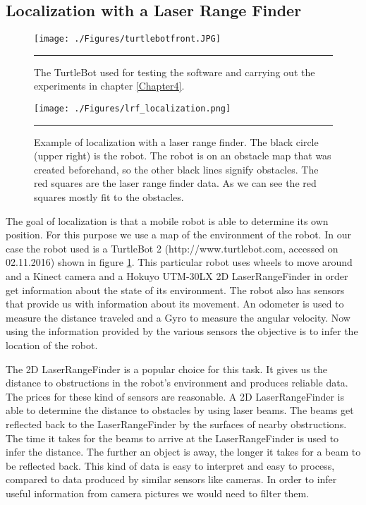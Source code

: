 \subsection{Localization with a Laser Range Finder}
\begin{figure}[htbp]
	\centering
		\texttt{[image: ./Figures/turtlebotfront.JPG]}
		\rule{35em}{0.5pt}
	\caption[TurtleBot]{The TurtleBot used for testing the software and carrying out the experiments in chapter \ref{Chapter4}.}
	\label{fig:turtlebot2}
\end{figure}
\begin{figure}[htbp]
	\centering
		\texttt{[image: ./Figures/lrf\_localization.png]}
		\rule{35em}{0.5pt}
	\caption[Example of localization with laser range finder]{Example of localization with a laser range finder. The black circle (upper right) is the robot. The robot is on an obstacle map that was created beforehand, so the other black lines signify obstacles. The red squares are the laser range finder data. As we can see the red squares mostly fit to the obstacles.}
	\label{fig:laser_range_finder}
\end{figure}
The goal of localization is that a mobile robot is able to determine its own position. For this purpose we use a map of the environment of the robot. In our case the robot used is a TurtleBot 2 (http://www.turtlebot.com, accessed on 02.11.2016) shown in figure \ref{fig:turtlebot2}. This particular robot uses wheels to move around and a Kinect camera \citep{ece21221} and a Hokuyo UTM-30LX 2D \gls{LaserRangeFinder} \citep{laser} in order get information about the state of its environment. The robot also has sensors that provide us with information about its movement. An odometer is used to measure the distance traveled and a \gls{Gyro} to measure the angular velocity. Now using the information provided by the various sensors the objective is to infer the location of the robot. 

The 2D \gls{LaserRangeFinder} is a popular choice for this task. It gives us the distance to obstructions in the robot's environment and produces reliable data. The prices for these kind of sensors are reasonable. A 2D \gls{LaserRangeFinder} is able to determine the distance to obstacles by using laser beams. The beams get reflected back to the \gls{LaserRangeFinder} by the surfaces of nearby obstructions. The time it takes for the beams to arrive at the \gls{LaserRangeFinder} is used to infer the distance. The further an object is away, the longer it takes for a beam to be reflected back. This kind of data is easy to interpret and easy to process, compared to data produced by similar sensors like cameras. In order to infer useful information from camera pictures we would need to filter them.

